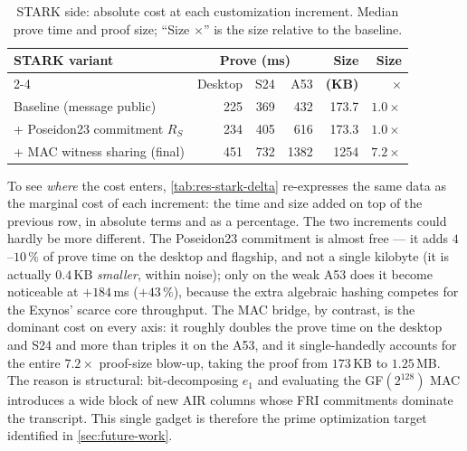 \documentclass[binding=0.6cm,oneside,noexaminfo]{sapthesis}
\begin{document}
\begin{table}[ht]
  \centering
  \caption{STARK side: absolute cost at each customization increment. Median
  prove time and proof size; ``Size $\times$'' is the size relative to the
  baseline.}
  \label{tab:res-stark-steps}
  \small
  \begin{tabular}{@{}lrrrrr@{}}
    \toprule
    \textbf{STARK variant} & \multicolumn{3}{c}{\textbf{Prove (ms)}} & \textbf{Size} & \textbf{Size} \\
    \cmidrule(lr){2-4}
     & Desktop & S24 & A53 & \textbf{(KB)} & \textbf{$\times$} \\
    \midrule
    Baseline (message public)                 & 225 & 369 & 432  & 173.7 & $1.0\times$ \\
    \;+ Poseidon23 commitment $R_S$           & 234 & 405 & 616  & 173.3 & $1.0\times$ \\
    \;+ MAC witness sharing (final)           & 451 & 732 & 1382 & 1254  & $7.2\times$ \\
    \bottomrule
  \end{tabular}
\end{table}

To see \emph{where} the cost enters, \cref{tab:res-stark-delta} re-expresses the
same data as the marginal cost of each increment: the time and size added on top
of the previous row, in absolute terms and as a percentage. The two increments
could hardly be more different. The Poseidon23 commitment is almost free --- it
adds $4$--$10\,\%$ of prove time on the desktop and flagship, and not a single
kilobyte (it is actually $0.4$\,KB \emph{smaller}, within noise); only on the weak
A53 does it become noticeable at $+184$\,ms ($+43\,\%$), because the extra
algebraic hashing competes for the Exynos' scarce core throughput. The MAC bridge,
by contrast, is the dominant cost on every axis: it roughly doubles the prove time
on the desktop and S24 and more than triples it on the A53, and it single-handedly
accounts for the entire $7.2\times$ proof-size blow-up, taking the proof from
$173$\,KB to $1.25$\,MB. The reason is structural: bit-decomposing $e_1$ and
evaluating the GF$(2^{128})$ MAC introduces a wide block of new AIR columns whose
FRI commitments dominate the transcript. This single gadget is therefore the prime
optimization target identified in \cref{sec:future-work}.
\end{document}
